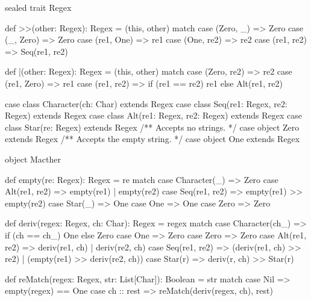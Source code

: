 \begin{scalacode}
sealed trait Regex {

  def >>(other: Regex): Regex = (this, other) match {
    case (Zero, _) => Zero
    case (_, Zero) => Zero
    case (re1, One) => re1
    case (One, re2) => re2
    case (re1, re2) => Seq(re1, re2)
  }

  def |(other: Regex): Regex = (this, other) match {
    case (Zero, re2) => re2
    case (re1, Zero) => re1
    case (re1, re2) => if (re1 == re2) re1 else Alt(re1, re2)
  }
}

case class Character(ch: Char) extends Regex
case class Seq(re1: Regex, re2: Regex) extends Regex
case class Alt(re1: Regex, re2: Regex) extends Regex
case class Star(re: Regex) extends Regex
/** Accepts no strings. */
case object Zero extends Regex
/** Accepts the empty string. */
case object One extends Regex

object Macther {

  def empty(re: Regex): Regex = re match {
    case Character(_) => Zero
    case Alt(re1, re2) => empty(re1) | empty(re2)
    case Seq(re1, re2) => empty(re1) >> empty(re2)
    case Star(_) => One
    case One => One
    case Zero => Zero
  }

  def deriv(regex: Regex, ch: Char): Regex = regex match {
    case Character(ch_) => if (ch == ch_) One else Zero
    case One => Zero
    case Zero => Zero
    case Alt(re1, re2) => deriv(re1, ch) | deriv(re2, ch)
    case Seq(re1, re2) => (deriv(re1, ch) >> re2) | (empty(re1) >> deriv(re2, ch))
    case Star(r) => deriv(r, ch) >> Star(r)
  }

  def reMatch(regex: Regex, str: List[Char]): Boolean = str match {
    case Nil => empty(regex) == One
    case ch :: rest => reMatch(deriv(regex, ch), rest)
  }

}
\end{scalacode}
